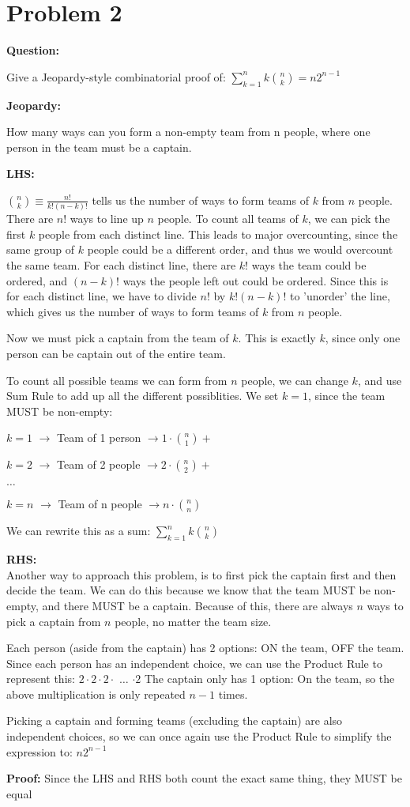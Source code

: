 \documentclass[11pt]{article}
\begin{document}
\section*{Problem 2}

\textbf{Question: }

Give a Jeopardy-style combinatorial proof of: $\sum_{k=1}^{n}k\binom{n}{k} = n2^{n-1}$

\textbf{Jeopardy: }

How many ways can you form a non-empty team from {n} people, where one person in the team must be a captain.

\textbf{LHS: }

$\binom{n}{k} \equiv \frac{n!}{k!(n-k)!}$ tells us the number of ways to form teams of $k$ from $n$ people. There are $n!$ ways to line up $n$ people. To count all teams of $k$, we can pick the first $k$ people from each distinct line. This leads to major overcounting, since the same group of $k$ people could be a different order, and thus we would overcount the same team. For each distinct line, there are $k!$ ways the team could be ordered, and $(n-k)!$ ways the people left out could be ordered. Since this is for each distinct line, we have to divide $n!$ by $k!(n-k)!$ to 'unorder' the line, which gives us the number of ways to form teams of $k$ from $n$ people.

Now we must pick a captain from the team of $k$. This is exactly $k$, since only one person can be captain out of the entire team.

To count all possible teams we can form from $n$ people, we can change $k$, and use Sum Rule to add up all the different possiblities. We set $k=1$, since the team MUST be non-empty:

$k = 1$ $\rightarrow$ Team of 1 person $\rightarrow 1 \cdot \binom{n}{1} +$

$k = 2$ $\rightarrow$ Team of 2 people $\rightarrow 2 \cdot \binom{n}{2} +$

$\dots$

$k = n$ $\rightarrow$ Team of {n} people $\rightarrow n \cdot \binom{n}{n}$


We can rewrite this as a sum: $\sum_{k=1}^{n}k\binom{n}{k} $

\textbf{RHS: }\\
Another way to approach this problem, is to first pick the captain first and then decide the team. We can do this because we know that the team MUST be non-empty, and there MUST be a captain. Because of this, there are always $n$ ways to pick a captain from $n$ people, no matter the team size.

Each person (aside from the captain) has 2 options: ON the team, OFF the team. Since each person has an independent choice, we can use the Product Rule to represent this: $2 \cdot 2 \cdot 2 \cdot $ $ \dots $ $ \cdot 2$ The captain only has 1 option: On the team, so the above multiplication is only repeated $n-1$ times.

Picking a captain and forming teams (excluding the captain) are also independent choices, so we can once again use the Product Rule to simplify the expression to: $n2^{n-1}$

\textbf{Proof: }
Since the LHS and RHS both count the exact same thing, they MUST be equal
\end{document}
